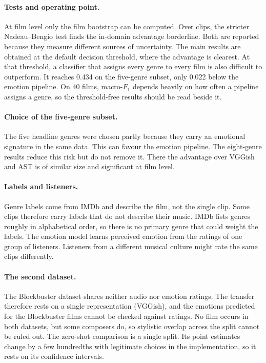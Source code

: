 \paragraph{Tests and operating point.} At film level only the film bootstrap can be
computed. Over clips, the stricter Nadeau--Bengio test finds the in-domain advantage
borderline. Both are reported because they measure different sources of uncertainty. The
main results are obtained at the default decision threshold, where the advantage is
clearest. At that threshold, a classifier that assigns every genre to every film is also
difficult to outperform. It reaches 0.434 on the five-genre subset, only 0.022 below the emotion
pipeline. On 40 films, macro-$F_1$ depends heavily on how often a pipeline assigns a genre, so the
threshold-free results should be read beside it.

\paragraph{Choice of the five-genre subset.} The five headline genres were chosen partly because they carry an emotional signature in the same data. This can favour the emotion
pipeline. The eight-genre results reduce this risk but do not remove it. There the
advantage over VGGish and AST is of similar size and significant at film level.

\paragraph{Labels and listeners.} Genre labels come from IMDb and describe the film, not
the single clip. Some clips therefore carry labels that do not describe their music. IMDb
lists genres roughly in alphabetical order, so there is no primary genre that could weight the labels. The
emotion model learns perceived emotion from the ratings of one group of listeners.
Listeners from a different musical culture might rate the same clips differently.

\paragraph{The second dataset.} The Blockbuster dataset shares neither audio nor emotion
ratings. The transfer therefore rests on a single representation (VGGish), and the
emotions predicted for the Blockbuster films cannot be checked against ratings. No film occurs in both datasets, but some
composers do, so stylistic overlap across the split cannot be ruled out. The zero-shot
comparison is a single split. Its point estimates change by a few hundredths with legitimate
choices in the implementation, so it rests on its confidence intervals.

